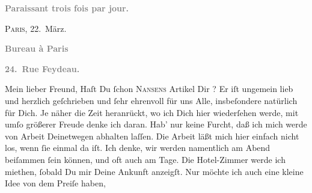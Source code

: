 \begin{ledgroupsized}[t]{13cm}
           \pstart
           \begin{otherlanguage}{french}\textcolor{gray}{\textbf{\textbf{Paraissant trois fois par jour.}}}\end{otherlanguage}\hfill \textsc{Paris}, 22. März.\pend
           \pstart
           \begin{otherlanguage}{french}\textcolor{gray}{\textbf{\textbf{Bureau à Paris}}}\end{otherlanguage}\pend
           \pstart
           \begin{otherlanguage}{french}\textcolor{gray}{\textbf{\textbf{24. Rue Feydeau.}}}\end{otherlanguage}\pend
           \pstart\center{}Mein lieber Freund,\pend\pstart
           Haſt Du ſchon \textsc{Nansens}{ }Artikel Dir \label{K_L02806-1v}\label{K_L02806-1h}? Er iſt ungemein lieb und herzlich geſchrieben und ſehr ehrenvoll für uns
               Alle, insbeſondere natürlich für Dich.\pend
           \pstart
           Je näher die Zeit heranrückt, wo ich Dich hier wiederſehen werde, mit umſo größerer
               Freude denke ich daran. Hab’ nur keine Furcht, daß ich mich werde von Arbeit
               Deinetwegen abhalten laſſen. Die Arbeit läßt mich hier einfach nicht los, wenn ſie
               einmal da iſt. Ich denke, wir werden namentlich am Abend beiſammen ſein können, und oft auch am Tage. {\pb} Die Hotel-Zimmer werde ich miethen, ſobald Du mir
               Deine Ankunft anzeigſt. Nur möchte ich auch eine kleine Idee von dem Preiſe haben,

\end{ledgroupsized}
